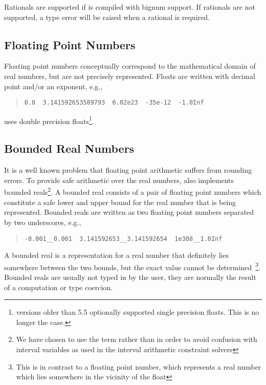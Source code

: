 Rationals are supported if {\eclipse} is compiled with bignum support.
If rationals are not supported, a type error will be raised when a rational is
required.

\subsection{Floating Point Numbers}
Floating point numbers conceptually correspond to the mathematical
domain of real numbers, but are not precisely represented.
Floats are written with decimal point and/or an exponent, e.g.,
\begin{quote}
\begin{verbatim}
0.0  3.141592653589793  6.02e23  -35e-12  -1.0Inf
\end{verbatim}
\end{quote}
{\eclipse} uses double precision floats\footnote{%
  {\eclipse} versions older than 5.5 optionally supported single precision
  floats. This is no longer the case.}.


\subsection{Bounded Real Numbers}
It is a well known problem that floating point arithmetic suffers
from rounding errors.
To provide safe arithmetic over the real numbers, {\eclipse}
also implements bounded reals\footnote{%
  We have chosen to use the term  rather than
   in order to avoid confusion with interval variables
  as used in the interval arithmetic constraint solvers}.
A bounded real consists of a pair of floating point numbers
which constitute a safe lower and upper bound for the real number that
is being represented. Bounded reals are written as two floating point
numbers separated by two underscores, e.g.,
\begin{quote}
\begin{verbatim}
-0.001__0.001  3.141592653__3.141592654  1e308__1.0Inf
\end{verbatim}
\end{quote}
A bounded real is a representation for a real number that definitely lies
somewhere between the two bounds, but the exact value cannot be determined\
\footnote{%
  This is in contrast to a floating point number, which represents
  a real number which lies somewhere in the vicinity of the float}.
Bounded reals are usually not typed in by the user, they are normally
the result of a computation or type coercion.

